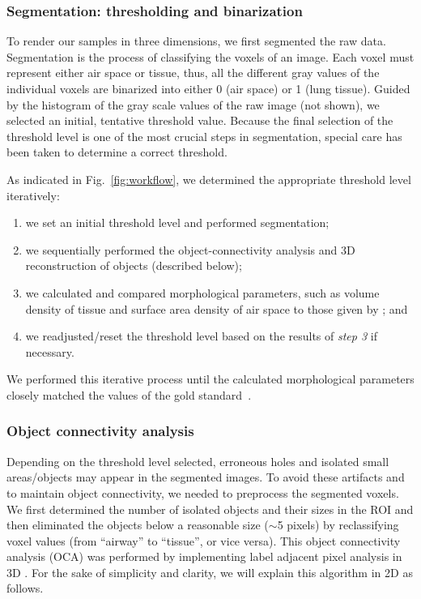 \subsubsection{Segmentation: thresholding and binarization}
To render our samples in three dimensions, we first segmented the raw data. Segmentation is the process of classifying the voxels of an image. Each voxel must represent either air space or tissue, thus, all the different gray values of the individual voxels are binarized into either 0 (air space) or 1 (lung tissue). Guided by the histogram of the gray scale values of the raw image (not shown), we selected an initial, tentative threshold value. Because the final selection of the threshold level is one of the most crucial steps in segmentation, special care has been taken to determine a correct threshold.

As indicated in Fig.~\ref{fig:workflow}, we determined the appropriate threshold level iteratively: 
\begin{enumerate}
	\item we set an initial threshold level and performed segmentation;
	\item we sequentially performed the object-connectivity analysis and 3D reconstruction of objects (described below);
	\item we calculated and compared morphological parameters, such as volume density of tissue and surface area density of air space to those given by \citet{Tschanz2003}; and
	\item we readjusted/reset the threshold level based on the results of \textit{step 3} if necessary.
\end{enumerate}

We performed this iterative process until the calculated morphological parameters closely matched the values of the gold standard~\cite{Tschanz2003}.

\subsubsection{Object connectivity analysis}
Depending on the threshold level selected, erroneous holes and isolated small areas/objects may appear in the segmented images. To avoid these artifacts and to maintain object connectivity, we needed to preprocess the segmented voxels. We first determined the number of isolated objects and their sizes in the ROI and then eliminated the objects below a reasonable size ($\sim$5 pixels) by reclassifying voxel values (from ``airway'' to ``tissue'', or vice versa). This object connectivity analysis (OCA) was performed by implementing label adjacent pixel analysis in 3D \cite{Ballard1982,Davies1990,Gonzalez1992}. For
the sake of simplicity and clarity, we will explain this algorithm in 2D as follows.

